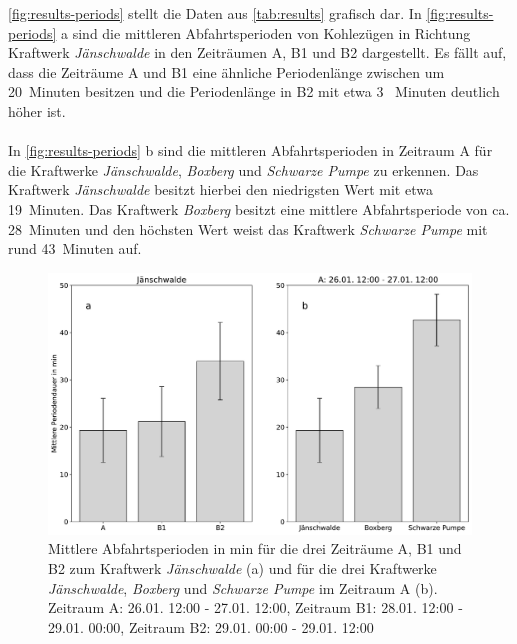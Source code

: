 \autoref{fig:results-periods} stellt die Daten aus \autoref{tab:results} grafisch dar. In \autoref{fig:results-periods} a sind die mittleren Abfahrtsperioden von Kohlezügen in Richtung Kraftwerk \emph{Jänschwalde} in den Zeiträumen A, B1 und B2 dargestellt. Es fällt auf, dass die Zeiträume A und B1 eine ähnliche Periodenlänge zwischen um 20~Minuten besitzen und die Periodenlänge in B2 mit etwa 3~ Minuten deutlich höher ist.\\
\\
In \autoref{fig:results-periods} b sind die mittleren Abfahrtsperioden in Zeitraum A für die Kraftwerke \emph{Jänschwalde}, \emph{Boxberg} und \emph{Schwarze Pumpe} zu erkennen. Das Kraftwerk \emph{Jänschwalde} besitzt hierbei den niedrigsten Wert mit etwa 19~Minuten. Das Kraftwerk \emph{Boxberg} besitzt eine mittlere Abfahrtsperiode von ca. 28~Minuten und den höchsten Wert weist das Kraftwerk \emph{Schwarze Pumpe} mit rund 43~Minuten auf.

\begin{figure}[!ht]
	\centering
	\includegraphics[width=1.0\linewidth]{images/results/periods.pdf}
	\caption{Mittlere Abfahrtsperioden in min für die drei Zeiträume A, B1 und B2 zum Kraftwerk \emph{Jänschwalde} (a) und für die drei Kraftwerke \emph{Jänschwalde}, \emph{Boxberg} und \emph{Schwarze Pumpe} im Zeitraum A (b). Zeitraum A: 26.01. 12:00 - 27.01. 12:00, Zeitraum B1: 28.01. 12:00 - 29.01. 00:00, Zeitraum B2: 29.01. 00:00 - 29.01. 12:00}
	\label{fig:results-periods}
\end{figure}



